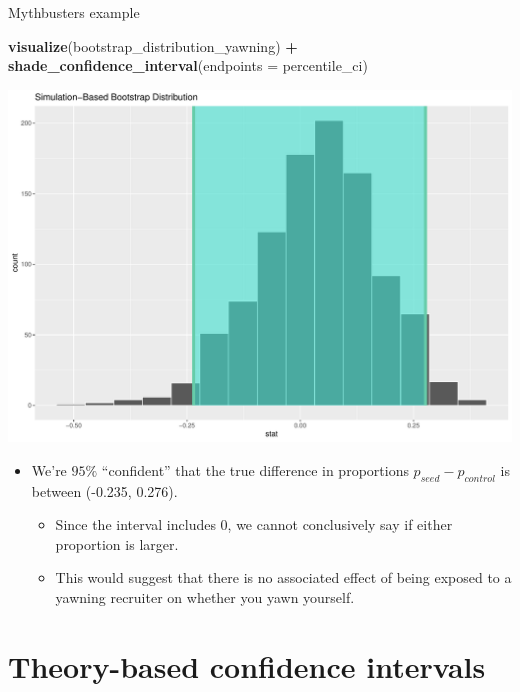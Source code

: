 \documentclass[
  ignorenonframetext,
]{beamer}
\newenvironment{Shaded}{\begin{snugshade}}{\end{snugshade}}
\newcommand{\AttributeTok}[1]{\textcolor[rgb]{0.13,0.29,0.53}{#1}}
\newcommand{\FunctionTok}[1]{\textcolor[rgb]{0.13,0.29,0.53}{\textbf{#1}}}
\newcommand{\NormalTok}[1]{#1}
\newcommand{\SpecialCharTok}[1]{\textcolor[rgb]{0.81,0.36,0.00}{\textbf{#1}}}
\providecommand{\tightlist}{%
  \setlength{\itemsep}{0pt}\setlength{\parskip}{0pt}}
\begin{document}
\begin{frame}[fragile]{Mythbusters example}
\protect\hypertarget{mythbusters-example-5}{}
\tiny

\begin{Shaded}
\begin{Highlighting}[]
\FunctionTok{visualize}\NormalTok{(bootstrap\_distribution\_yawning) }\SpecialCharTok{+}
\FunctionTok{shade\_confidence\_interval}\NormalTok{(}\AttributeTok{endpoints =}\NormalTok{ percentile\_ci)}
\end{Highlighting}
\end{Shaded}

\begin{center}\includegraphics[width=0.6\linewidth,height=0.4\textheight]{Week10_Lect_files/figure-beamer/unnamed-chunk-44-1} \end{center}
\normalsize

\begin{itemize}
\item
  We're \(95\%\) ``confident'' that the true difference in proportions
  \(p_{seed}-p_{control}\) is between (-0.235, 0.276).

  \begin{itemize}
  \tightlist
  \item
    Since the interval includes 0, we cannot conclusively say if either
    proportion is larger.
  \item
    This would suggest that there is no associated effect of being
    exposed to a yawning recruiter on whether you yawn yourself.
  \end{itemize}
\end{itemize}
\end{frame}

\hypertarget{theory-based-confidence-intervals}{%
\section{Theory-based confidence
intervals}\label{theory-based-confidence-intervals}}
\end{document}
